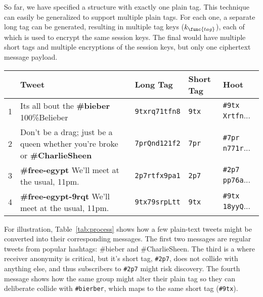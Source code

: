 So far, we have specified a \hoot structure with exactly one plain tag.
This technique can easily be generalized to support multiple plain tags. For
each one, a separate long tag can be generated, resulting in multiple
tag keys ($k_{\func{tag}}$), each of which is used to encrypt the same
session keys. The final \hoot would have multiple short tags and multiple
encryptions of the session keys, but only one ciphertext message
payload.

\begin{table*}
\caption{This table shows how several tweets might be converted to
  \hoot messages, showing the long tag, the short tag, and the final
  \hoot. The fourth message in this list demonstrates how an
  organization could take advantage of the \hoot system to collide its
  messages with those of an unrelated tag used for non-controversial
  messages.
\label{tab:process}
}
\begin{center}
    \begin{tabular}{ l  l  l  l  l }
	 & Tweet & Long Tag & Short Tag & Hoot \\ \hline
	1 & Its all bout the {\bf \#bieber} 100\%Belieber                                 & {\tt 9txrq71tfn8} &  {\tt 9tx} & {\tt \#9tx Xrtfn}... \\
	2 & Don't be a drag; just be a queen whether you're broke or {\bf \#CharlieSheen} & {\tt 7prQnd121f2} & {\tt 7pr} & {\tt \#7pr n771r}... \\
	3 & {\bf \#free-egypt} We'll meet at the usual, 11pm.                             & {\tt 2p7rtfx9pa1} & {\tt 2p7} & {\tt \#2p7 pp76a}... \\
	4 & {\bf \#free-egypt-9rqt} We'll meet at the usual, 11pm.                        & {\tt 9tx79srpLtt} &  {\tt 9tx}  & {\tt \#9tx 18yyQ}... \\
    \end{tabular}
\end{center}
\end{table*}

For illustration, Table~\ref{tab:process} shows how a few plain-text
tweets might be converted into their corresponding \hoot messages. The
first two messages are regular tweets from popular hashtags: \#bieber
and \#CharlieSheen. The third is a \hoot where receiver anonymity is
critical, but it's short tag, {\tt \#2p7}, does not collide with
anything else, and thus subscribers to {\tt \#2p7} might risk
discovery. The fourth message shows how the same group might alter
their plain tag so they can deliberate collide with {\tt \#bierber},
which maps to the same short tag ({\tt \#9tx}).


